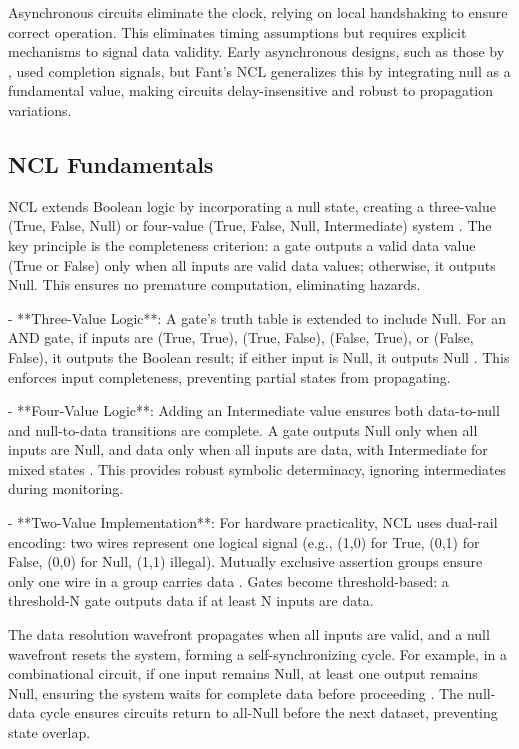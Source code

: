 \documentclass{article}
\begin{document}
Asynchronous circuits eliminate the clock, relying on local handshaking to ensure correct operation. This eliminates timing assumptions but requires explicit mechanisms to signal data validity. Early asynchronous designs, such as those by \citet{seitz1980}, used completion signals, but Fant's NCL generalizes this by integrating null as a fundamental value, making circuits delay-insensitive and robust to propagation variations.

\subsection{NCL Fundamentals}
NCL extends Boolean logic by incorporating a null state, creating a three-value (True, False, Null) or four-value (True, False, Null, Intermediate) system \citep{fant2005}. The key principle is the completeness criterion: a gate outputs a valid data value (True or False) only when all inputs are valid data values; otherwise, it outputs Null. This ensures no premature computation, eliminating hazards.

- **Three-Value Logic**: A gate's truth table is extended to include Null. For an AND gate, if inputs are (True, True), (True, False), (False, True), or (False, False), it outputs the Boolean result; if either input is Null, it outputs Null \citep{fant2005}. This enforces input completeness, preventing partial states from propagating.

- **Four-Value Logic**: Adding an Intermediate value ensures both data-to-null and null-to-data transitions are complete. A gate outputs Null only when all inputs are Null, and data only when all inputs are data, with Intermediate for mixed states \citep{fant2005}. This provides robust symbolic determinacy, ignoring intermediates during monitoring.

- **Two-Value Implementation**: For hardware practicality, NCL uses dual-rail encoding: two wires represent one logical signal (e.g., (1,0) for True, (0,1) for False, (0,0) for Null, (1,1) illegal). Mutually exclusive assertion groups ensure only one wire in a group carries data \citep{fant2005}. Gates become threshold-based: a threshold-N gate outputs data if at least N inputs are data.

The data resolution wavefront propagates when all inputs are valid, and a null wavefront resets the system, forming a self-synchronizing cycle. For example, in a combinational circuit, if one input remains Null, at least one output remains Null, ensuring the system waits for complete data before proceeding \citep{fant2005}. The null-data cycle ensures circuits return to all-Null before the next dataset, preventing state overlap.
\end{document}
